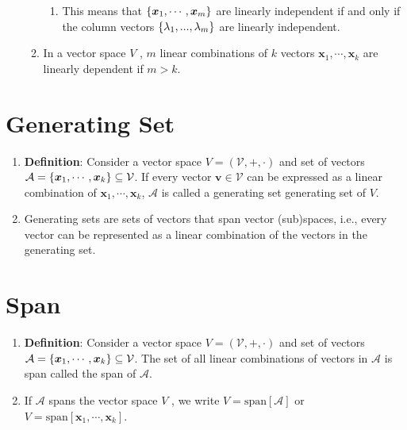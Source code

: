 \begin{enumerate}
\begin{enumerate}
\begin{enumerate}
            \item This means that $\left\{\bm{x}_1, \cdots , \bm{x}_m\right\}$ are linearly independent if and only if the column vectors $\left\{\lambda_1, . . . , \lambda_m\right\}$ are linearly independent.
            \hfill \cite{mfml/book/mml/Deisenroth-Faisal-Ong}
        \end{enumerate}

        \item In a vector space $V$ , $m$ linear combinations of $k$ vectors $\bm{x}_1, \cdots , \bm{x}_k$ are linearly dependent if $m > k$.
        \hfill \cite{mfml/book/mml/Deisenroth-Faisal-Ong}
    \end{enumerate}
\end{enumerate}





\section{Generating Set}

\begin{enumerate}
    \item \textbf{Definition}: Consider a vector space $V = (\mathcal{V}, +, \cdot)$ and set of vectors $\mathcal{A} = \left\{\bm{x}_1, \cdots , \bm{x}_k\right\} \subseteq \mathcal{V}$. 
    If every vector $\bm{v} \in \mathcal{V}$ can be expressed as a linear combination of $\bm{x}_1, \cdots , \bm{x}_k$, $\mathcal{A}$ is called a generating set generating set of $V$.
    \hfill \cite{mfml/book/mml/Deisenroth-Faisal-Ong}

    \item Generating sets are sets of vectors that span vector (sub)spaces, i.e., every vector can be represented as a linear combination of the vectors in the generating set.
    \hfill \cite{mfml/book/mml/Deisenroth-Faisal-Ong}
\end{enumerate}








\section{Span}

\begin{enumerate}
    \item \textbf{Definition}: Consider a vector space $V = (\mathcal{V}, +, \cdot)$ and set of vectors $\mathcal{A} = \left\{\bm{x}_1, \cdots , \bm{x}_k\right\} \subseteq \mathcal{V}$. 
    The set of all linear combinations of vectors in $\mathcal{A}$ is span called the span of $\mathcal{A}$.
    \hfill \cite{mfml/book/mml/Deisenroth-Faisal-Ong}

    \item If $\mathcal{A}$ spans the vector space $V$ , we write $V = \text{span}[\mathcal{A}]$ or $V = \text{span}[\bm{x}_1, \cdots , \bm{x}_k]$.
    \hfill \cite{mfml/book/mml/Deisenroth-Faisal-Ong}
\end{enumerate}





